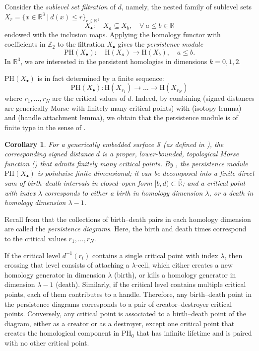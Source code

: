 \documentclass[11pt]{article}
\newcommand{\R}{\mathbb{R}}
\newcommand{\PH}{\mathrm{PH}}
\newcommand{\Xb}{X_\bullet}
\newcommand{\Surf}{\mathcal{S}}
\renewcommand{\H}{\mathrm{H}}
\theoremstyle{plain}
\newtheorem{cor}{Corollary}
\theoremstyle{definition}
\theoremstyle{remark}
\begin{document}
Consider the \textit{sublevel set filtration} of $d$, namely, the nested family of sublevel sets $X_r = \{x \in \R^3 ~|~ d(x) \leq r\}_{r \in \R}$,
\[\Xb : \quad X_a \subseteq X_b, \quad \forall\ a \leq b \in \R\]
endowed with the inclusion maps.
Applying the homology functor with coefficients in $\mathbb{Z}_2$ to the filtration $\Xb$ gives the \textit{persistence module}
\[\PH(\Xb) : \quad \H(X_a) \to \H(X_{b}), \quad a \leq b.\]
In $\R^3$, we are interested in the persistent homologies in dimensions $k = 0, 1, 2$.

$\PH(\Xb)$ is in fact determined by a finite sequence:
\[\PH(\Xb) : \H(X_{r_1}) \to \ldots \to \H(X_{r_N})\]
where $r_1,\ldots,r_N$ are the critical values of $d$. Indeed, by combining  (signed distances are generically Morse with finitely many critical points)
with  (isotopy lemma) and  (handle attachment lemma), we obtain that the persistence module is of finite type in the sense of \cite[Section 3.8]{chazal_stability_2007}. 

\begin{cor} \label{cor:gendistPH_finite}
For a generically embedded surface $\Surf$ (as defined in ), the corresponding signed distance $d$ is a proper, lower-bounded, topological Morse function () that admits finitely many critical points. By , the persistence module $\PH(\Xb)$ is pointwise finite-dimensional; it can be decomposed into a finite direct sum of birth--death intervals in closed--open form $[b,d) \subset \bar{\R}$;
and a critical point with index $\lambda$ corresponds to either a birth in homology dimension $\lambda$, or a death in homology dimension $\lambda - 1$.
\end{cor}
Recall from  that the collections of birth--death pairs in each homology dimension are called the \textit{persistence diagrams}. 
Here, the birth and death times correspond to the critical values $r_1, \ldots, r_N$.

If the critical level $d^{-1}(r_i)$ contains a single critical point with index $\lambda$, then crossing that level consists of attaching a $\lambda$-cell, which either creates a new homology generator in dimension $\lambda$ (birth), or kills a homology generator in dimension $\lambda - 1$ (death). Similarly, if the critical level contains multiple critical points, each of them contributes to a handle. Therefore, any birth--death point in the persistence diagrams corresponds to a pair of creator--destroyer critical points.  Conversely, any critical point is associated to a birth--death point of the diagram, either as a creator or as a destroyer, except one critical point that creates the homological component in $\PH_0$ that has infinite lifetime and is paired with no other critical point.
\end{document}
